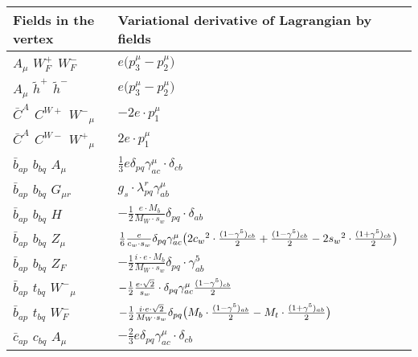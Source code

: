\begin{center}
\begin{tabular}{|l|l|} \hline
Fields in the vertex & Variational derivative of Lagrangian by fields \\ \hline
${A}_{\mu }$ \phantom{-} $W^+_F{}_{}$ \phantom{-} $W^-_F{}_{}$ \phantom{-}  &
	$ e\big(p_3^\mu -p_2^\mu \big)$\\[2mm]
${A}_{\mu }$ \phantom{-} $\widetilde{h}^+{}_{}$ \phantom{-} $\widetilde{h}^-{}_{}$ \phantom{-}  &
	$ e\big(p_3^\mu -p_2^\mu \big)$\\[2mm]
$\bar{C}^A{}_{}$ \phantom{-} $C^{W+}{}_{}$ \phantom{-} $W^-{}_{\mu }$ \phantom{-}  &
	$-2 e\cdot p_1^\mu $\\[2mm]
$\bar{C}^A{}_{}$ \phantom{-} $C^{W-}{}_{}$ \phantom{-} $W^+{}_{\mu }$ \phantom{-}  &
	$2 e\cdot p_1^\mu $\\[2mm]
$\bar{b}{}_{a p }$ \phantom{-} $b{}_{b q }$ \phantom{-} ${A}_{\mu }$ \phantom{-}  &
	$\frac{1}{3} e\delta_{p q} \gamma_{a c}^\mu \cdot \delta_{c b} $\\[2mm]
$\bar{b}{}_{a p }$ \phantom{-} $b{}_{b q }$ \phantom{-} ${G}_{\mu r }$ \phantom{-}  &
	$ g_s\cdot \lambda_{p q}^r \gamma_{a b}^\mu $\\[2mm]
$\bar{b}{}_{a p }$ \phantom{-} $b{}_{b q }$ \phantom{-} ${H}_{}$ \phantom{-}  &
	$-\frac{1}{2}\frac{ e \cdot M_b}{ M_W \cdot s_w}\delta_{p q} \cdot \delta_{a b} $\\[2mm]
$\bar{b}{}_{a p }$ \phantom{-} $b{}_{b q }$ \phantom{-} ${Z}_{\mu }$ \phantom{-}  &
	$\frac{1}{6}\frac{ e}{ c_w \cdot s_w}\delta_{p q} \gamma_{a c}^\mu \big(2 c_w{}^2 \cdot {(1-\gamma^5)_{c b}\over 2} +{(1-\gamma^5)_{c b}\over 2} -2 s_w{}^2 \cdot {(1+\gamma^5)_{c b}\over 2} \big)$\\[2mm]
$\bar{b}{}_{a p }$ \phantom{-} $b{}_{b q }$ \phantom{-} $Z_F{}_{}$ \phantom{-}  &
	$-\frac{1}{2}\frac{ i \cdot e \cdot M_b}{ M_W \cdot s_w}\delta_{p q} \cdot \gamma_{a b}^5 $\\[2mm]
$\bar{b}{}_{a p }$ \phantom{-} $t{}_{b q }$ \phantom{-} $W^-{}_{\mu }$ \phantom{-}  &
	$-\frac{1}{2}\frac{ e \cdot\sqrt{2}}{ s_w}\cdot \delta_{p q} \gamma_{a c}^\mu {(1-\gamma^5)_{c b}\over 2} $\\[2mm]
$\bar{b}{}_{a p }$ \phantom{-} $t{}_{b q }$ \phantom{-} $W^-_F{}_{}$ \phantom{-}  &
	$-\frac{1}{2}\frac{ i \cdot e \cdot\sqrt{2}}{ M_W \cdot s_w}\delta_{p q} \big( M_b\cdot {(1-\gamma^5)_{a b}\over 2} - M_t\cdot {(1+\gamma^5)_{a b}\over 2} \big)$\\[2mm]
$\bar{c}{}_{a p }$ \phantom{-} $c{}_{b q }$ \phantom{-} ${A}_{\mu }$ \phantom{-}  &
	$-\frac{2}{3} e\delta_{p q} \gamma_{a c}^\mu \cdot \delta_{c b} $\\[2mm]

\end{tabular}
\end{center}
